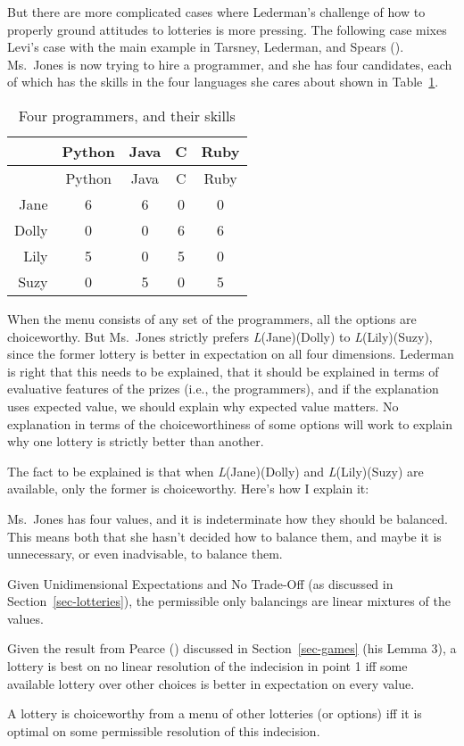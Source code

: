 \documentclass[
  10.5pt,
  twoside]{article}
\providecommand{\tightlist}{%
  \setlength{\itemsep}{0pt}\setlength{\parskip}{0pt}}
\let\oldenumerate\enumerate
\let\endoldenumerate\endenumerate
\renewenvironment{enumerate}
  {\vskip 5pt\oldenumerate}
  {\endoldenumerate\vskip 5pt}
\begin{document}
But there are more complicated cases where Lederman's challenge of how
to properly ground attitudes to lotteries is more pressing. The
following case mixes Levi's case with the main example in Tarsney,
Lederman, and Spears ().
Ms.~Jones is now trying to hire a programmer, and she has four
candidates, each of which has the skills in the four languages she cares
about shown in Table~\ref{tbl-programmers}.

\begin{longtable}[]{@{}rcccc@{}}
\caption{Four programmers, and their
skills}\label{tbl-programmers}\tabularnewline
\toprule\noalign{}
& Python & Java & C & Ruby \\
\midrule\noalign{}
\endfirsthead
\toprule\noalign{}
& Python & Java & C & Ruby \\
\midrule\noalign{}
\endhead
\bottomrule\noalign{}
\endlastfoot
Jane & 6 & 6 & 0 & 0 \\
Dolly & 0 & 0 & 6 & 6 \\
Lily & 5 & 0 & 5 & 0 \\
Suzy & 0 & 5 & 0 & 5 \\
\end{longtable}

When the menu consists of any set of the programmers, all the options
are choiceworthy. But Ms.~Jones strictly prefers \emph{L}(Jane)(Dolly)
to \emph{L}(Lily)(Suzy), since the former lottery is better in
expectation on all four dimensions. Lederman is right that this needs to
be explained, that it should be explained in terms of evaluative
features of the prizes (i.e., the programmers), and if the explanation
uses expected value, we should explain why expected value matters. No
explanation in terms of the choiceworthiness of some options will work
to explain why one lottery is strictly better than another.

The fact to be explained is that when \emph{L}(Jane)(Dolly) and
\emph{L}(Lily)(Suzy) are available, only the former is choiceworthy.
Here's how I explain it:

\begin{enumerate}
\def\labelenumi{\arabic{enumi}.}
\tightlist
\item
  Ms.~Jones has four values, and it is indeterminate how they should be
  balanced. This means both that she hasn't decided how to balance them,
  and maybe it is unnecessary, or even inadvisable, to balance them.
\item
  Given Unidimensional Expectations and No Trade-Off (as discussed in
  Section~\ref{sec-lotteries}), the permissible only balancings are
  linear mixtures of the values.
\item
  Given the result from Pearce ()
  discussed in Section~\ref{sec-games} (his Lemma 3), a lottery is best
  on no linear resolution of the indecision in point 1 iff some
  available lottery over other choices is better in expectation on every
  value.
\item
  A lottery is choiceworthy from a menu of other lotteries (or options)
  iff it is optimal on some permissible resolution of this indecision.
\end{enumerate}
\end{document}
